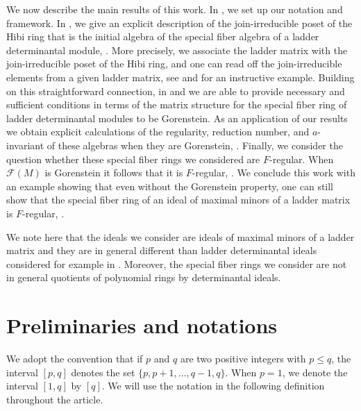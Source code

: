 \documentclass[11pt,a4paper,reqno,dvipsnames]{amsart}
\theoremstyle{plain}
\theoremstyle{definition}
\newtheorem{Assumptions and Discussion}[Theorem]{Assumptions and Discussion}
\theoremstyle{remark}
\newcommand\calF{\mathcal{F}}
\begin{document}
We now describe the main results of this work. In , we set up our notation and framework. In , we give an explicit description of the join-irreducible poset of the Hibi ring that is the initial algebra of the special fiber algebra of a ladder determinantal module, .
More precisely, we associate the ladder matrix with the join-irreducible poset of the Hibi ring, and one can read off the join-irreducible elements from a given ladder matrix, see  and  for an instructive example.  
Building on this straightforward connection, in  and  we are able to provide necessary and sufficient conditions in terms of the matrix structure for  the special fiber ring of ladder determinantal modules to be Gorenstein. 
As an application of our results we obtain explicit calculations of the regularity, reduction number, and $a$-invariant of these algebras when they are Gorenstein, . 
Finally, we consider the question whether these special fiber rings we considered are $F$-regular. When $\calF(M)$ is Gorenstein it follows that it is $F$-regular, . We conclude this work with an example showing that even without the Gorenstein property, one can still show that the special fiber ring of an ideal of maximal minors of a ladder matrix is $F$-regular, .



We note here that the ideals we consider are ideals of maximal minors of a ladder matrix and they are in general different than ladder determinantal ideals considered for example in \cite{ConcaLadder}. Moreover, the special fiber rings we consider are not in general quotients of polynomial rings by determinantal ideals.

\section{Preliminaries and notations}
\label{sec:prelim}


We adopt the convention that if $p$ and $q$ are two positive integers with $p\le q$, the interval $[p,q]$ denotes the set $\{p,p+1,\dots,q-1,q\}$. When $p=1$, we denote the interval $[1,q]$ by $[q]$. 
We will use the notation in the following definition throughout the article. 
\end{document}
